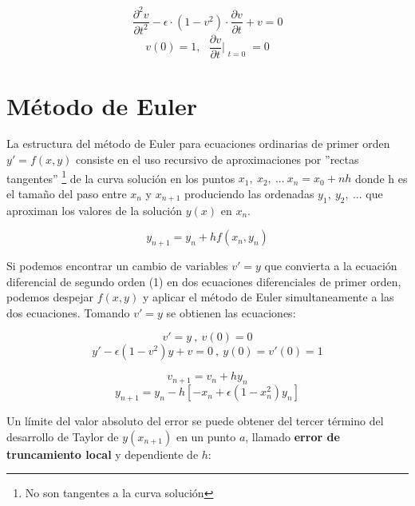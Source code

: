 \documentclass[a4paper, 10pt, spanish]{article}
\begin{document}
\begin{equation}
\frac{\partial^2 v}{\partial t^2} - \epsilon \cdot (1-v^2) \cdot \frac{\partial v}{\partial t} + v = 0  
\end{equation}
\begin{equation}
v(0) = 1,\ \ \ \frac{\partial v}{\partial t }\Bigr|_{\substack{t=0}} = 0 \nonumber
\end{equation}

\newpage
        	
\section{Método de Euler}
La estructura del método de Euler para ecuaciones ordinarias de primer orden $y' = f(x,y)$ consiste en el uso recursivo de aproximaciones por ''rectas tangentes'' \footnote{No son tangentes a la curva solución} de la curva solución en los puntos $x_1,\ x_2,\ ...\ x_n = x_0 + nh$ donde h es el tamaño del paso entre $x_n$ y $x_{n+1}$ produciendo las ordenadas $y_1,\ y_2,\ ...$ que aproximan los valores de la solución $y(x)$ en $x_n$.

\begin{equation}
y_{n+1} = y_n + hf(x_n,y_n)
\end{equation} 

Si podemos encontrar un cambio de variables $v' = y$ que convierta a la ecuación diferencial de segundo orden (1) en dos ecuaciones diferenciales de primer orden, podemos despejar $f(x,y)$ y aplicar el método de Euler simultaneamente a las dos ecuaciones. Tomando $v' = y$ se obtienen las ecuaciones:

\begin{equation}
v' = y\ , \ v(0) = 0 \nonumber
\end{equation}
\begin{equation}
y' - \epsilon(1-v^2)y + v = 0\ ,\ y(0) = v'(0) = 1 \nonumber
\end{equation}

\begin{equation}
v_{n+1} = v_n + hy_n
\end{equation}
\begin{equation}
y_{n+1} = y_n - h[-x_n + \epsilon(1-x_n^2)y_n] 
\end{equation}

Un límite del valor absoluto del error se puede obtener del tercer término del desarrollo de Taylor de $y(x_{n+1})$ en un punto $a$, llamado \textbf{error de truncamiento local} y dependiente de $h$:
\end{document}
